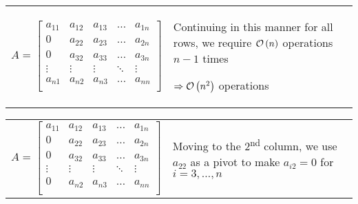 \begin{center}
    \begin{tabular}{p{6cm}p{6cm}}
\begin{equation*}
    A = 
    \begin{bmatrix}  
        a_{11} & a_{12} & a_{13} & \ldots & a_{1n} \\
        0      & a_{22} & a_{23} & \ldots & a_{2n} \\
        0      & a_{32} & a_{33} & \ldots & a_{3n} \\
        \vdots & \vdots & \vdots & \ddots & \vdots \\
        a_{n1} & a_{n2} & a_{n3} & \ldots & a_{nn} \\
    \end{bmatrix}  
\end{equation*}
               & 
        \vspace{1em}
Continuing in this manner for all rows,
        we require $\mathcal{O}\left(n\right)$ operations $n-1$ times
        \begin{displayquote}
            $\Rightarrow \mathcal{O}\left(n^2\right)$ operations 
        \end{displayquote}
                                                   \\
    \end{tabular}
\end{center}
\begin{center}
    \begin{tabular}{p{6cm}p{6cm}}
\begin{equation*}
    A = 
    \begin{bmatrix}  
        a_{11} & a_{12} & a_{13} & \ldots & a_{1n} \\
        0      & a_{22} & a_{23} & \ldots & a_{2n} \\
        0      & a_{32} & a_{33} & \ldots & a_{3n} \\
        \vdots & \vdots & \vdots & \ddots & \vdots \\
        0      & a_{n2} & a_{n3} & \ldots & a_{nn} \\
    \end{bmatrix}  
\end{equation*}
               & 
        \vspace{1em}
        Moving to the 2\textsuperscript{nd} column, we use $a_{22}$ as a pivot to make $a_{i2}=0$
        for $i=3, \ldots, n$
    \end{tabular}
\end{center}

